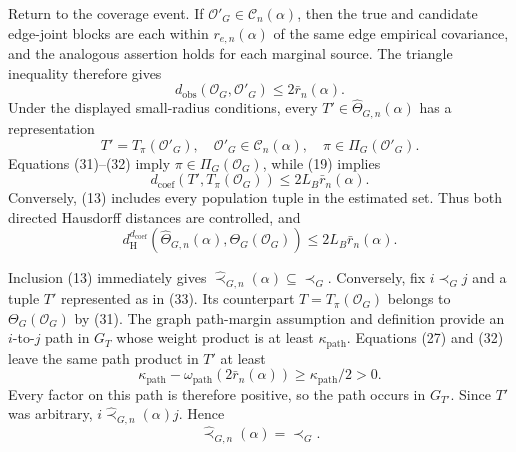 Return to the coverage event.  If \(\mathcal O'_G\in\mathcal C_n(\alpha)\), then the true and candidate edge-joint blocks are each within \(r_{e,n}(\alpha)\) of the same edge empirical covariance, and the analogous assertion holds for each marginal source.  The triangle inequality therefore gives
\[
d_{\mathrm{obs}}(\mathcal O_G,\mathcal O'_G)
\le2\bar r_n(\alpha).
\tag{32}
\]
Under the displayed small-radius conditions, every \(T'\in\widehat\Theta_{G,n}(\alpha)\) has a representation
\[
T'=T_\pi(\mathcal O'_G),
\quad
\mathcal O'_G\in\mathcal C_n(\alpha),
\quad
\pi\in\Pi_G(\mathcal O'_G).
\tag{33}
\]
Equations (31)--(32) imply \(\pi\in\Pi_G(\mathcal O_G)\), while (19) implies
\[
d_{\mathrm{coef}}(T',T_\pi(\mathcal O_G))
\le2L_B\bar r_n(\alpha).
\tag{34}
\]
Conversely, (13) includes every population tuple in the estimated set.  Thus both directed Hausdorff distances are controlled, and
\[
d_{\mathrm H}^{d_{\mathrm{coef}}}
(\widehat\Theta_{G,n}(\alpha),\Theta_G(\mathcal O_G))
\le2L_B\bar r_n(\alpha).
\tag{35}
\]

Inclusion (13) immediately gives \(\widehat\prec_{G,n}(\alpha)\subseteq\prec_G\).  Conversely, fix \(i\prec_Gj\) and a tuple \(T'\) represented as in (33).  Its counterpart \(T=T_\pi(\mathcal O_G)\) belongs to \(\Theta_G(\mathcal O_G)\) by (31).  The graph path-margin assumption and definition provide an \(i\)-to-\(j\) path in \(G_T\) whose weight product is at least \(\kappa_{\mathrm{path}}\).  Equations (27) and (32) leave the same path product in \(T'\) at least
\[
\kappa_{\mathrm{path}}-
\omega_{\mathrm{path}}(2\bar r_n(\alpha))
\ge\kappa_{\mathrm{path}}/2>0.
\tag{36}
\]
Every factor on this path is therefore positive, so the path occurs in \(G_{T'}\).  Since \(T'\) was arbitrary, \(i\widehat\prec_{G,n}(\alpha)j\).  Hence
\[
\widehat\prec_{G,n}(\alpha)=\prec_G.
\tag{37}
\]

